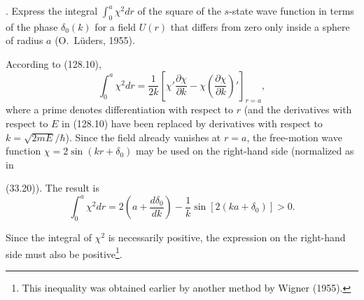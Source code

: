 . Express the integral $\int_0^a\chi^2dr$ of the square of
the $s$-state wave function in terms of the phase $\delta_0(k)$ for a field
$U(r)$ that differs from zero only inside a sphere of radius $a$
(O.~Lüders, 1955).

\SolutionHeading According to (128.10),
\[
 \int_0^a\chi^2dr=\frac1{2k}\left[\chi'\frac{\partial\chi}{\partial k}
 -\chi\left(\frac{\partial\chi}{\partial k}\right)'\right]_{r=a},
\]
where a prime denotes differentiation with respect to $r$ (and the
derivatives with respect to $E$ in (128.10) have been replaced by derivatives
with respect to $k=\sqrt{2mE}/\hbar$). Since the field already vanishes at
$r=a$, the free-motion wave function
$\chi=2\sin(kr+\delta_0)$ may be used on the right-hand side (normalized as in

(33.20)). The result is
\[
 \int_0^a\chi^2dr=2\left(a+\frac{d\delta_0}{dk}\right)-\frac1k\sin[2(ka+\delta_0)]>0.
\]

Since the integral of $\chi^2$ is necessarily positive, the expression on the
right-hand side must also be positive\footnote{This inequality was obtained
earlier by another method by Wigner (1955).}.
